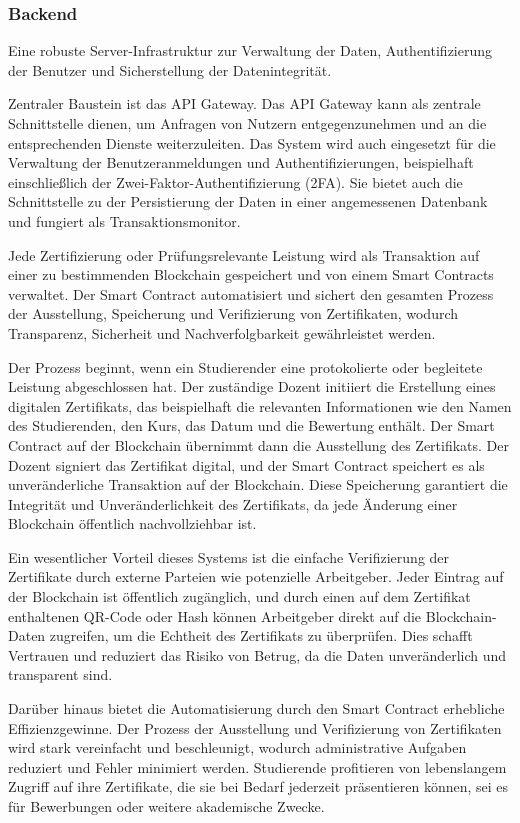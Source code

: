 \documentclass[conference]{IEEEtran}
\begin{document}
\subsubsection{Backend}
Eine robuste Server-Infrastruktur zur Verwaltung der Daten, Authentifizierung der Benutzer und Sicherstellung der Datenintegrität.

Zentraler Baustein ist das API Gateway. Das API Gateway kann als zentrale Schnittstelle dienen, um Anfragen von Nutzern entgegenzunehmen und an die entsprechenden Dienste weiterzuleiten. Das System wird auch eingesetzt für die Verwaltung der Benutzeranmeldungen und Authentifizierungen, beispielhaft einschließlich der Zwei-Faktor-Authentifizierung (2FA). Sie bietet auch die Schnittstelle zu der Persistierung der Daten in einer angemessenen Datenbank und fungiert als Transaktionsmonitor.

Jede Zertifizierung oder Prüfungsrelevante Leistung wird als Transaktion auf einer zu bestimmenden Blockchain gespeichert und von einem Smart Contracts verwaltet. Der Smart Contract automatisiert und sichert den gesamten Prozess der Ausstellung, Speicherung und Verifizierung von Zertifikaten, wodurch Transparenz, Sicherheit und Nachverfolgbarkeit gewährleistet werden.

Der Prozess beginnt, wenn ein Studierender eine protokolierte oder begleitete Leistung abgeschlossen hat. Der zuständige Dozent initiiert die Erstellung eines digitalen Zertifikats, das beispielhaft die relevanten Informationen wie den Namen des Studierenden, den Kurs, das Datum und die Bewertung enthält. Der Smart Contract auf der Blockchain übernimmt dann die Ausstellung des Zertifikats. Der Dozent signiert das Zertifikat digital, und der Smart Contract speichert es als unveränderliche Transaktion auf der Blockchain. Diese Speicherung garantiert die Integrität und Unveränderlichkeit des Zertifikats, da jede Änderung einer Blockchain öffentlich nachvollziehbar ist.

Ein wesentlicher Vorteil dieses Systems ist die einfache Verifizierung der Zertifikate durch externe Parteien wie potenzielle Arbeitgeber. Jeder Eintrag auf der Blockchain ist öffentlich zugänglich, und durch einen auf dem Zertifikat enthaltenen QR-Code oder Hash können Arbeitgeber direkt auf die Blockchain-Daten zugreifen, um die Echtheit des Zertifikats zu überprüfen. Dies schafft Vertrauen und reduziert das Risiko von Betrug, da die Daten unveränderlich und transparent sind.

Darüber hinaus bietet die Automatisierung durch den Smart Contract erhebliche Effizienzgewinne. Der Prozess der Ausstellung und Verifizierung von Zertifikaten wird stark vereinfacht und beschleunigt, wodurch administrative Aufgaben reduziert und Fehler minimiert werden. Studierende profitieren von lebenslangem Zugriff auf ihre Zertifikate, die sie bei Bedarf jederzeit präsentieren können, sei es für Bewerbungen oder weitere akademische Zwecke. 
\end{document}
